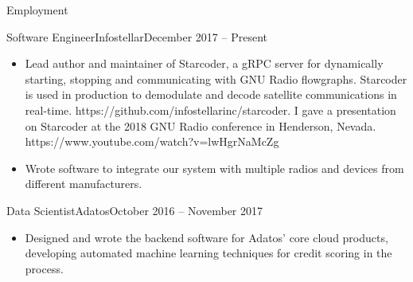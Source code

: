 \documentclass[]{mcdowellcv}
\begin{document}
	\makeheader
	
	\begin{cvsection}{Employment}
		\begin{cvsubsection}{Software Engineer}{Infostellar}{December 2017 -- Present}
			\begin{itemize}
				\item Lead author and maintainer of Starcoder, a gRPC server for dynamically starting, stopping and communicating with GNU Radio flowgraphs. Starcoder is used in production to demodulate and decode satellite communications in real-time. https://github.com/infostellarinc/starcoder. I gave a presentation on Starcoder at the 2018 GNU Radio conference in Henderson, Nevada. https://www.youtube.com/watch?v=lwHgrNaMcZg
				\item Wrote software to integrate our system with multiple radios and devices from different manufacturers.
			\end{itemize}
		\end{cvsubsection}
		
		\begin{cvsubsection}{Data Scientist}{Adatos}{October 2016 -- November 2017}	
			\begin{itemize}
				\item Designed and wrote the backend software for Adatos' core cloud products, developing automated machine learning techniques for credit scoring in the process.
			\end{itemize}
		\end{cvsubsection}
	\end{cvsection}
	
\end{document}
